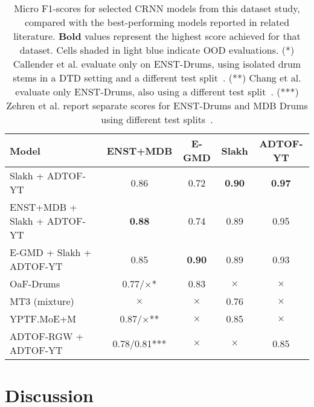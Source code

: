 \begin{table}[H]
    \centering
    \hspace*{-0.6cm}
    \begin{tabular}{l|cccc}
        Model & ENST+MDB & E-GMD & Slakh & ADTOF-YT      \\
        \hline
        Slakh + ADTOF-YT & \cellcolor{blue!5} 0.86	& \cellcolor{blue!5} 0.72 & \textbf{0.90}	& \textbf{0.97} \\
        ENST+MDB + Slakh + ADTOF-YT & \textbf{0.88}	& 0.74 & \cellcolor{blue!5} 0.89	& 0.95 \\
        E-GMD + Slakh + ADTOF-YT & \cellcolor{blue!5} 0.85 & \textbf{0.90} & 0.89 & 0.93 \\
        \hline
        OaF-Drums~\cite{callender2020improvingperceptualqualitydrum} & \cellcolor{blue!5} 0.77/$\times$* & 0.83 & $\times$ & $\times$ \\
        \hline
        MT3 (mixture)~\cite{gardner2022mt3multitaskmultitrackmusic} & $\times$ & $\times$ & 0.76 & $\times$ \\
        \hline
        YPTF.MoE+M~\cite{chang2024yourmt3+} & 0.87/$\times$** & $\times$ & 0.85 & $\times$ \\
        \hline
        ADTOF-RGW + ADTOF-YT~\cite{signals4040042} & \cellcolor{blue!5}0.78/0.81*** & $\times$ & $\times$ & 0.85 \\
    \end{tabular}
    \caption{Micro F1-scores for selected \acrlong{CRNN} models from this dataset study, compared with the best-performing models reported in related literature. \textbf{Bold} values represent the highest score achieved for that dataset. Cells shaded in \colorbox{blue!10}{light blue} indicate \acrshort{OOD} evaluations. \newline
    (*) Callender et al. evaluate only on ENST-Drums, using isolated drum stems in a \gls{DTD} setting and a different test split~\cite{callender2020improvingperceptualqualitydrum}. \newline
    (**) Chang et al. evaluate only ENST-Drums, also using a different test split~\cite{chang2024yourmt3+}. \newline
    (***) Zehren et al. report separate scores for ENST-Drums and MDB Drums using different test splits~\cite{signals4040042}.
    }
    \label{DatasetComparisonTable}
\end{table}

\section{Discussion}

